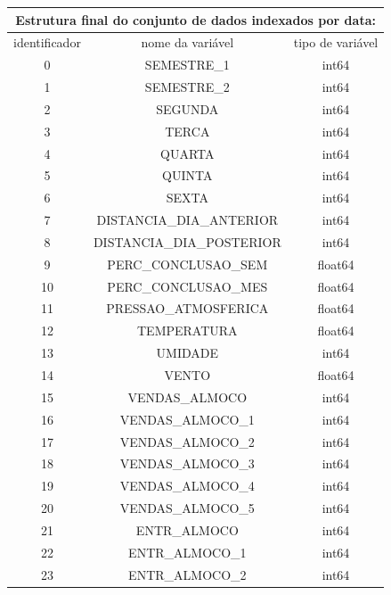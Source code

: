        \begin{table}[!ht]
            \centering
            \begin{tabular}{c|c|c} \hline
                \multicolumn{3}{c}{ Estrutura final do conjunto de dados indexados por data: } \\
                \hline
                identificador &	nome da variável					&tipo de variável\\ 
                \hline
                0&	SEMESTRE\_1					&int64 \\
                1&	SEMESTRE\_2					&int64\\
                2&	SEGUNDA						&int64 \\
                3&	TERCA						&int64 \\
                4&	QUARTA						&int64 \\ 
                5&	QUINTA						&int64 \\ 
                6&	SEXTA						&int64 \\ 
                7&	DISTANCIA\_DIA\_ANTERIOR	&	int64 \\ 
                8&	DISTANCIA\_DIA\_POSTERIOR	&	int64 \\
                9&	PERC\_CONCLUSAO\_SEM		&	float64 \\
                10&	PERC\_CONCLUSAO\_MES		&	float64 \\
                11&	PRESSAO\_ATMOSFERICA		&	float64 \\
                12&	TEMPERATURA					&float64 \\ 
                13&	UMIDADE						&int64 \\
                14&	VENTO						&float64\\ 
                15&	VENDAS\_ALMOCO				&int64 \\
                16&	VENDAS\_ALMOCO\_1			&	int64 \\ 
                17&	VENDAS\_ALMOCO\_2			&	int64 \\
                18&	VENDAS\_ALMOCO\_3			&	int64\\ 
                19&	VENDAS\_ALMOCO\_4			&	int64 \\
                20&	VENDAS\_ALMOCO\_5			&	int64 \\ 
                21&	ENTR\_ALMOCO				&	int64\\
                22&	ENTR\_ALMOCO\_1				&int64 \\
                23&	ENTR\_ALMOCO\_2				&int64 \\

\end{tabular}
\end{table}
